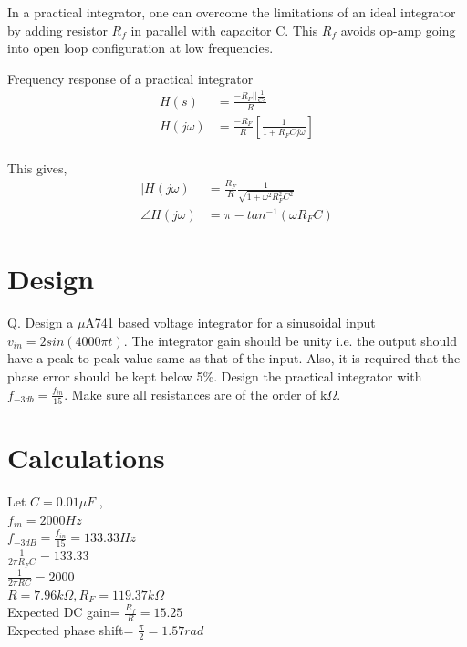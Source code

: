 \documentclass[12pt, titlepage]{article}
\theoremstyle{definition}
\begin{document}
    In a practical integrator, one can overcome the limitations of an ideal integrator by adding resistor $R_{f}$ in parallel with capacitor C.
    This $R_{f}$ avoids op-amp going into open loop configuration at low frequencies.

    Frequency response of a practical integrator
    \begin{align*}
    H(s) &=\frac{-R_{F} || \frac{1}{Cs}}{R} \\
    H(j\omega)&=\frac{-R_{F}}{R} \left[ \frac{1}{1+R_{F}Cj\omega} \right] \\
    \end{align*}

    This gives,
    \begin{align*}
    |H(j\omega)|&=\frac{R_{F}}{R}\frac{1}{\sqrt{1+\omega^{2}R_{F}^{2}C^{2}}} \\
    \angle H(j\omega) &= \pi - tan^{-1}(\omega R_{F}C)
    \end{align*}


  \newpage
  \section{Design}
    Q. Design a $\mu$A741 based voltage integrator for a sinusoidal input $v_{in} = 2sin(4000\pi t)$.
    The integrator gain should be unity i.e. the output should have a peak to peak value same as that of the input.
    Also, it is required that the phase error should be kept below 5\%.
    Design the practical integrator with $f_{-3db} = \frac{f_{in}}{15}$.
    Make sure all resistances are of the order of k$\Omega$.


  \section{Calculations}
    Let $C=0.01\mu F$ , \\
    $f_{in}=2000 Hz$\\
    $f_{-3dB}=\frac{f_{in}}{15} = 133.33 Hz$ \\
    $\frac{1}{2\pi R_{F}C} = 133.33$\\
    $\frac{1}{2\pi RC} = 2000$\\
    $R=7.96k\Omega, R_{F}=119.37k\Omega$\\
    Expected DC gain= $\frac{R_{f}}{R}=15.25$\\
    Expected phase shift= $\frac{\pi}{2}=1.57 rad$


  \newpage
\end{document}
